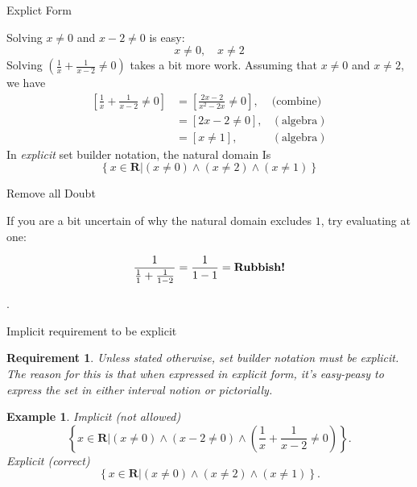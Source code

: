 \documentclass[usenames,dvipsnames,fleqn,leqno,10pt, pdflatex]{beamer}
\newcommand{\reals}{\mathbf{R}}
\newtheorem{require}{Requirement}
\newtheorem{myexample}{Example}
\begin{document}
\begin{frame}{Explict Form}

Solving $ x \neq 0$ and $x-2 \neq 0$ is easy:
\[ 
    x \neq 0, \quad x \neq 2
\]
Solving \(\left(\frac{1}{x} + \frac{1}{x-2} \neq 0 \right) \) takes
a bit more work. Assuming that $x \neq 0$ and $x \neq 2$, we have
\begin{align*}
    \left[\frac{1}{x} + \frac{1}{x-2} \neq 0 \right] 
       &= \left[\frac{2 x-2}{{{x}^{2}}-2 x} \neq 0 \right],  &\mbox{(combine)}\\
       &= \left[2 x-2 \neq 0 \right], &(\mbox{algebra}) \\
       &=  \left[x  \neq 1 \right], &(\mbox{algebra})
\end{align*}
In \emph{explicit} set builder notation, the natural domain Is\
\begin{equation*}
    \left\{ x \in \reals \bigg | \left(x \neq 0\right)  
    \land \left(x  \neq 2 \right) \land  
    \left(x \neq 1 \right) \right\}
\end{equation*}
\end{frame}

\begin{frame}{Remove all Doubt}

If you are a bit uncertain of why the natural domain excludes $1$,
try evaluating at one:

\begin{equation*}
    \frac{1}{\frac{1}{1} + \frac{1}{1-2}} = \frac{1}{1 - 1} =
    \mbox{\textbf{Rubbish!}}
\end{equation*}

\vfill.
\end{frame}


\begin{frame}{Implicit requirement to be explicit}

    \begin{require} Unless stated otherwise, set builder notation
        must be explicit. The reason for this is that when expressed
        in explicit form, it's easy-peasy to express the set in either
        interval notion or pictorially.
    \end{require}
    
    \begin{myexample} Implicit (not allowed)
        \begin{equation*}
            \left\{ x \in \reals \bigg | \left(x \neq 0 \right)  
            \land \left(x-2 \neq 0 \right) \land  
            \left(\frac{1}{x} + \frac{1}{x-2} \neq 0 \right) \right\}.
        \end{equation*}
    Explicit (correct)
    \begin{equation*}
        \left\{ x \in \reals \bigg | \left(x \neq 0\right)  
        \land \left(x  \neq 2 \right) \land  
        \left(x \neq 1 \right) \right\}.
    \end{equation*}
    \end{myexample}
    
        
    \end{frame}
 
\end{document}

